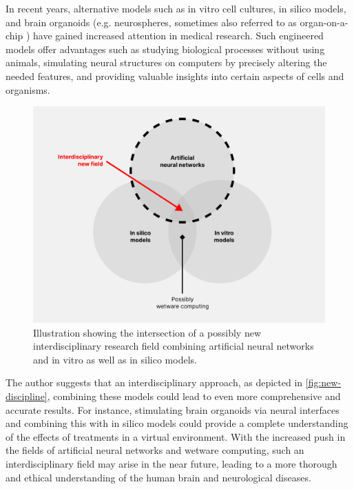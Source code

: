 \documentclass[10pt]{article}
\begin{document}
\begin{sloppypar}
  In recent years, alternative models such as in vitro cell cultures, in silico models, and brain organoids (e.g. neurospheres, sometimes also referred to as organ-on-a-chip \citep{huh_reconstituting_2010}) have gained increased attention in medical research. Such engineered models offer advantages such as studying biological processes without using animals, simulating neural structures on computers by precisely altering the needed features, and providing valuable insights into certain aspects of cells and organisms.

  \begin{figure}[ht]
    \centering
    \includegraphics[width=\textwidth]{figures/new-discipline.png}
    \caption[Illustration showing the intersection of a possibly new interdisciplinary research field combining artificial neural networks and in vitro as well as in silico models.]{Illustration showing the intersection of a possibly new interdisciplinary research field combining artificial neural networks and in vitro as well as in silico models.}
    \label{fig:new-discipline}
  \end{figure}

  The author suggests that an interdisciplinary approach, as depicted in \autoref{fig:new-discipline}, combining these models could lead to even more comprehensive and accurate results. For instance, stimulating brain organoids via neural interfaces and combining this with in silico models could provide a complete understanding of the effects of treatments in a virtual environment. With the increased push in the fields of artificial neural networks and wetware computing, such an interdisciplinary field may arise in the near future, leading to a more thorough and ethical understanding of the human brain and neurological diseases.

  \pagebreak
  \singlespacing %
  
  

\end{sloppypar}
\end{document}
